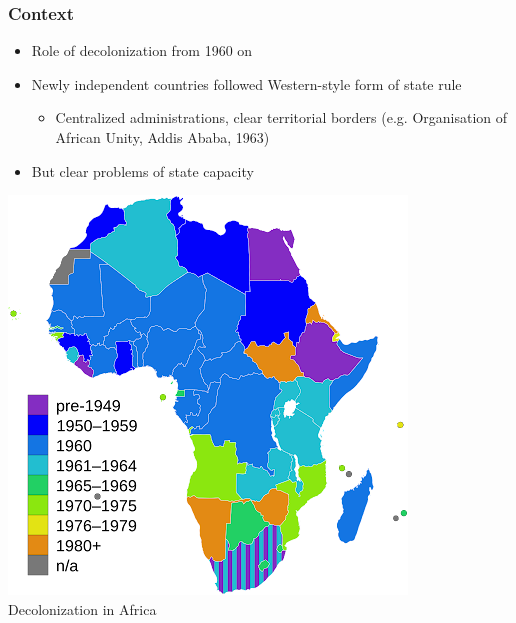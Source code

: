 \documentclass[utf8, xcolor=dvipsnames]{beamer}
\begin{document}
\begin{frame}
\frametitle{Context}
\centering

\begin{minipage}{0.49\textwidth}\centering
\begin{itemize}
  \item Role of decolonization from 1960 on
  \item Newly independent countries followed Western-style form of state rule
  \begin{itemize}
    \item Centralized administrations, clear territorial borders (e.g. Organisation of African Unity, Addis Ababa, 1963)
  \end{itemize}
  \item But clear problems of state capacity
\end{itemize}
\end{minipage}\hfill
\begin{minipage}{0.49\textwidth}\centering
\includegraphics[width = \textwidth]{img/africa_decolonization}\\
Decolonization in Africa
\end{minipage}

\end{frame}
\end{document}
